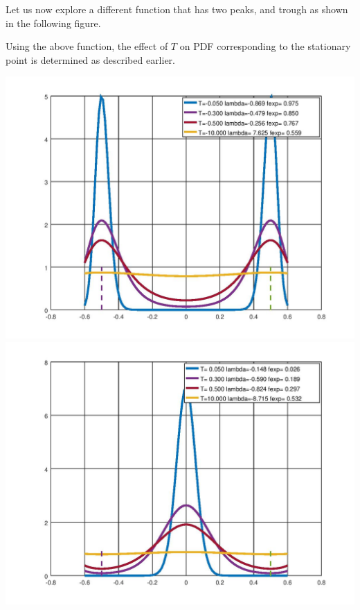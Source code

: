 \documentclass{article}
\begin{document}
Let us now explore a different function that has two peaks, and trough as shown in the
following figure. 
\begin{tcolorbox}[fonttitle=\sffamily\bfseries\large,
    title={$y(x)=8(1-2x^2)x^2  -0.6<x<0.6  $} ]
    \centering
     
\end{tcolorbox}

Using the above function, the effect of $T$ on PDF corresponding to the stationary
point is determined as described earlier.

\begin{tcolorbox}[fonttitle=\sffamily\bfseries\large,
    title={Effect of $T$ on PDF at stationary condition}  ]
     \includegraphics[scale=0.3]{fig3.jpg}
     \hspace{1cm}
     \includegraphics[scale=0.3]{fig4.jpg}
\end{tcolorbox}
\end{document}
